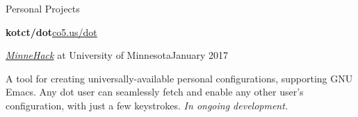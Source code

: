 \begin{minipage}[t]{0.67\textwidth}



  \vspace{10pt}

  {\sectionfont Personal Projects}

  \vspace{5pt}
  \textbf{kotct/dot}\hfill\href{https://github.com/kotct/dot/}{co5.us/dot}
  \begin{adjustwidth}{10pt}{}
    \emph{\href{https://minnehack.io/}{MinneHack}} at University of Minnesota\hfill January 2017

    A tool for creating universally-available personal configurations, supporting GNU Emacs.
    Any dot user can seamlessly fetch and enable any other user's configuration, with just a few keystrokes.
    \emph{In ongoing development.}
  \end{adjustwidth}





\end{minipage}
